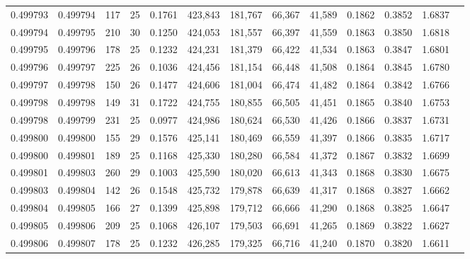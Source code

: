 \begin{tabular}{rrrrrrrrrrrrr}
0.499793 & 0.499794 & 117 &  25 &                                     0.1761 & 423,843 & 181,767 &  66,367 &  41,589 & 0.1862 & 0.3852 & 1.6837 \\
0.499794 & 0.499795 & 210 &  30 &                                     0.1250 & 424,053 & 181,557 &  66,397 &  41,559 & 0.1863 & 0.3850 & 1.6818 \\
0.499795 & 0.499796 & 178 &  25 &                                     0.1232 & 424,231 & 181,379 &  66,422 &  41,534 & 0.1863 & 0.3847 & 1.6801 \\
0.499796 & 0.499797 & 225 &  26 &                                     0.1036 & 424,456 & 181,154 &  66,448 &  41,508 & 0.1864 & 0.3845 & 1.6780 \\
0.499797 & 0.499798 & 150 &  26 &                                     0.1477 & 424,606 & 181,004 &  66,474 &  41,482 & 0.1864 & 0.3842 & 1.6766 \\
0.499798 & 0.499798 & 149 &  31 &                                     0.1722 & 424,755 & 180,855 &  66,505 &  41,451 & 0.1865 & 0.3840 & 1.6753 \\
0.499798 & 0.499799 & 231 &  25 &                                     0.0977 & 424,986 & 180,624 &  66,530 &  41,426 & 0.1866 & 0.3837 & 1.6731 \\
0.499800 & 0.499800 & 155 &  29 &                                     0.1576 & 425,141 & 180,469 &  66,559 &  41,397 & 0.1866 & 0.3835 & 1.6717 \\
0.499800 & 0.499801 & 189 &  25 &                                     0.1168 & 425,330 & 180,280 &  66,584 &  41,372 & 0.1867 & 0.3832 & 1.6699 \\
0.499801 & 0.499803 & 260 &  29 &                                     0.1003 & 425,590 & 180,020 &  66,613 &  41,343 & 0.1868 & 0.3830 & 1.6675 \\
0.499803 & 0.499804 & 142 &  26 &                                     0.1548 & 425,732 & 179,878 &  66,639 &  41,317 & 0.1868 & 0.3827 & 1.6662 \\
0.499804 & 0.499805 & 166 &  27 &                                     0.1399 & 425,898 & 179,712 &  66,666 &  41,290 & 0.1868 & 0.3825 & 1.6647 \\
0.499805 & 0.499806 & 209 &  25 &                                     0.1068 & 426,107 & 179,503 &  66,691 &  41,265 & 0.1869 & 0.3822 & 1.6627 \\
0.499806 & 0.499807 & 178 &  25 &                                     0.1232 & 426,285 & 179,325 &  66,716 &  41,240 & 0.1870 & 0.3820 & 1.6611 \\

\end{tabular}
